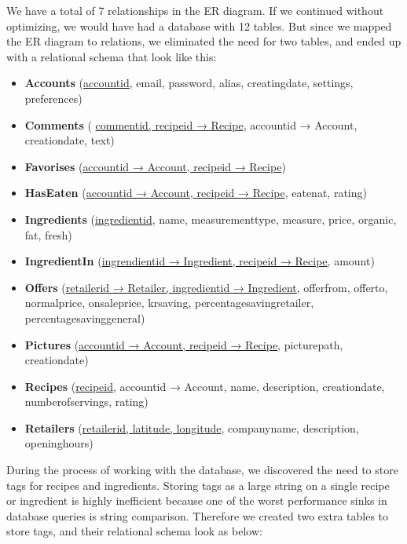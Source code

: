 We have a total of 7 relationships in the ER diagram. If we continued without optimizing, we would have had a database with 12 tables. But since we mapped the ER diagram to relations, we eliminated the need for two tables, and ended up with a relational schema that look like this:

\begin{itemize}
\item \textbf{Accounts} (\underline{accountid}, email, password, alias, creatingdate, settings, preferences)
%
\item \textbf{Comments} ( \underline{commentid, recipeid → Recipe}, accountid → Account, creationdate, text)

\item \textbf{Favorises} (\underline{accountid → Account, recipeid → Recipe})

\item \textbf{HasEaten} (\underline{accountid → Account, recipeid → Recipe}, eatenat, rating)

\item \textbf{Ingredients} (\underline{ingredientid}, name, measurementtype, measure, price, organic, fat, fresh)

\item \textbf{IngredientIn} (\underline{ingrendientid → Ingredient, recipeid → Recipe}, amount)

\item \textbf{Offers} (\underline{retailerid → Retailer, ingredientid → Ingredient}, offerfrom, offerto, normalprice, onsaleprice, krsaving, percentagesavingretailer, percentagesavinggeneral)

\item \textbf{Pictures} (\underline{accountid → Account, recipeid → Recipe}, picturepath, creationdate)

\item \textbf{Recipes} (\underline{recipeid}, accountid → Account, name, description, creationdate, numberofservings, rating)

\item \textbf{Retailers} (\underline{retailerid, latitude, longitude}, companyname, description, openinghours)
\end{itemize}

During the process of working with the database, we discovered the need to store tags for recipes and ingredients. Storing tags as a large string on a single recipe or ingredient is highly inefficient because one of the worst performance sinks in database queries is string comparison. Therefore we created two extra tables to store tags, and their relational schema look as below:

